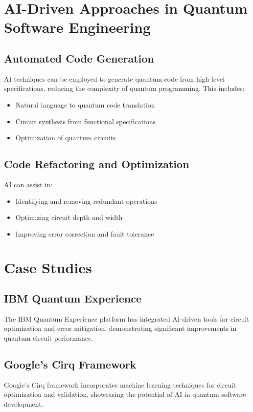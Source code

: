 \documentclass[12pt,a4paper]{article}
\begin{document}
\section{AI-Driven Approaches in Quantum Software Engineering}
\subsection{Automated Code Generation}
AI techniques can be employed to generate quantum code from high-level specifications, reducing the complexity of quantum programming. This includes:
\begin{itemize}[leftmargin=*]
    \item Natural language to quantum code translation
    \item Circuit synthesis from functional specifications
    \item Optimization of quantum circuits
\end{itemize}

\subsection{Code Refactoring and Optimization}
AI can assist in:
\begin{itemize}[leftmargin=*]
    \item Identifying and removing redundant operations
    \item Optimizing circuit depth and width
    \item Improving error correction and fault tolerance
\end{itemize}

\section{Case Studies}
\subsection{IBM Quantum Experience}
The IBM Quantum Experience platform has integrated AI-driven tools for circuit optimization and error mitigation, demonstrating significant improvements in quantum circuit performance.

\subsection{Google's Cirq Framework}
Google's Cirq framework incorporates machine learning techniques for circuit optimization and validation, showcasing the potential of AI in quantum software development.
\end{document}
